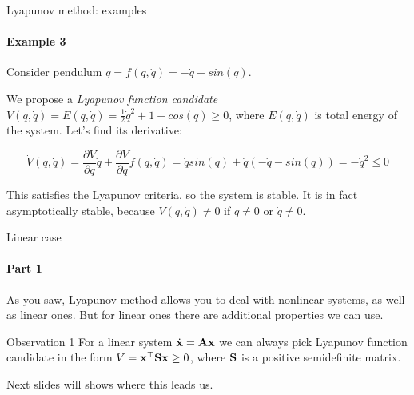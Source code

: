 \documentclass{beamer}
\begin{document}
\begin{frame}{Lyapunov method: examples}
\framesubtitle{Example 3}
\begin{flushleft}

Consider pendulum $\ddot{q} = f(q, \dot{q}) = -\dot{q} - sin(q)$. 

\bigskip

We propose a \emph{Lyapunov function candidate} $V(q, \dot{q}) = E(q, \dot{q}) = \frac{1}{2} \dot{q}^2 + 1 - cos(q)\geq 0$, where $E(q, \dot{q})$ is total energy of the system. Let's find its derivative:

\begin{equation}
    \dot V(q, \dot{q}) = 
    \frac{\partial V}{\partial q}       \dot{q} +
    \frac{\partial V}{\partial \dot{q}} f(q, \dot{q}) = 
    \dot{q} sin(q) + \dot{q}(-\dot{q} - sin(q)) =
    -\dot{q}^2 \leq 0
\end{equation}


This satisfies the Lyapunov criteria, so the system is stable. It is in fact asymptotically stable, because $V(q, \dot{q}) \neq 0$ if $q \neq 0$ or $\dot{q} \neq 0$.

\end{flushleft}
\end{frame}


\begin{frame}{Linear case}
\framesubtitle{Part 1}
\begin{flushleft}

As you saw, Lyapunov method allows you to deal with nonlinear systems, as well as linear ones. But for linear ones there are additional properties we can use.

\begin{block}{Observation 1}
For a linear system $\dot{\mathbf{x}} = \mathbf{A}\mathbf{x}$ we can always pick Lyapunov function candidate in the form $V = \mathbf{x}^\top\mathbf{S}\mathbf{x} \geq 0$, where $\mathbf{S}$ is a positive semidefinite matrix.
\end{block}

\bigskip

Next slides will shows where this leads us.

\end{flushleft}
\end{frame}
\end{document}
